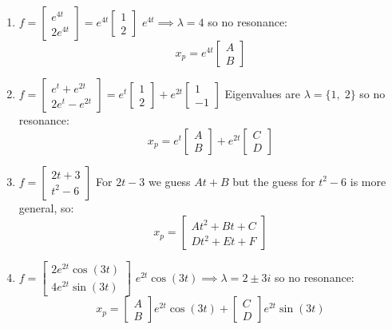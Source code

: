 \documentclass[12pt]{article}
\begin{document}
\begin{enumerate}
    \item $f = \begin{bmatrix}
        e^{4t}\\
        2e^{4t}
    \end{bmatrix} = e^{4t} \begin{bmatrix}
        1\\2
    \end{bmatrix}$
    $e^{4t} \implies \lambda = 4$ so no resonance:
    \[\boxed{x_p = e^{4t}\begin{bmatrix}
        A\\B
    \end{bmatrix}}\]

    \item $f = \begin{bmatrix}
        e^t + e^{2t}\\
        2e^t - e^{2t}
    \end{bmatrix} = e^t \begin{bmatrix}
        1\\2
    \end{bmatrix} + e^{2t} \begin{bmatrix}
        1\\-1
    \end{bmatrix}$
    Eigenvalues are $\lambda = \{1, \; 2\}$ so no resonance:
    \[\boxed{x_p = e^t\begin{bmatrix}
        A\\B
    \end{bmatrix}} + e^{2t} \begin{bmatrix}
        C\\D
    \end{bmatrix}\]

    \item $f = \begin{bmatrix}
        2t + 3\\
        t^2 - 6
    \end{bmatrix}$
    For $2t - 3$ we guess $At + B$ but the guess for $t^2 - 6$ is more general, so:
    \[\boxed{x_p = \begin{bmatrix}
        At^2 + Bt + C\\
        Dt^2 + Et + F
    \end{bmatrix}}\]

    \item $f = \begin{bmatrix}
        2e^{2t} \cos(3t)\\
        4e^{2t} \sin(3t)
    \end{bmatrix}$
    $e^{2t} \cos(3t) \implies \lambda = 2 \pm 3i$ so no resonance:
    \[\boxed{x_p = \begin{bmatrix}
        A\\B
    \end{bmatrix}e^{2t} \cos(3t) + \begin{bmatrix}
        C\\D
    \end{bmatrix}e^{2t} \sin (3t)}\]


\end{enumerate}
\end{document}

